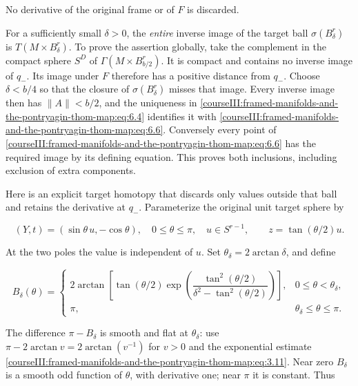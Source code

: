 No derivative of the original frame or of \(F\) is discarded.

For a sufficiently small \(\delta>0\), the \emph{entire} inverse image of the target ball \(\sigma(B_\delta^r)\) is \(T(M\times B_\delta^r)\). To prove the assertion globally, take the complement in the compact sphere \(S^D\) of \(\Gamma(M\times B_{b/2}^r)\). It is compact and contains no inverse image of \(q_-\). Its image under \(F\) therefore has a positive distance from \(q_-\). Choose \(\delta<b/4\) so that the closure of \(\sigma(B_\delta^r)\) misses that image. Every inverse image then has \(\|A\|<b/2\), and the uniqueness in \eqref{courseIII:framed-manifolds-and-the-pontryagin-thom-map:eq:6.4} identifies it with \eqref{courseIII:framed-manifolds-and-the-pontryagin-thom-map:eq:6.6}. Conversely every point of \eqref{courseIII:framed-manifolds-and-the-pontryagin-thom-map:eq:6.6} has the required image by its defining equation. This proves both inclusions, including exclusion of extra components.

Here is an explicit target homotopy that discards only values outside that ball and retains the derivative at \(q_-\). Parameterize the original unit target sphere by

\begin{equation}
(Y,t)=(\sin\theta\,u,-\cos\theta),\quad
       0\leq\theta\leq\pi,\quad u\in S^{r-1},\qquad
 z=\tan(\theta/2)u.
 \label{courseIII:framed-manifolds-and-the-pontryagin-thom-map:eq:6.8}
\end{equation}

At the two poles the value is independent of \(u\). Set \(\theta_\delta=2\arctan\delta\), and define

\begin{equation}
B_\delta(\theta)=
 \begin{cases}
 2\arctan\!\left[
 \tan(\theta/2)
 \exp\!\left(\dfrac{\tan^2(\theta/2)}
                   {\delta^2-\tan^2(\theta/2)}\right)\right],
                                  &0\leq\theta<\theta_\delta,\\
 \pi,                            &\theta_\delta\leq\theta\leq\pi.
 \end{cases}
 \label{courseIII:framed-manifolds-and-the-pontryagin-thom-map:eq:6.9}
\end{equation}

The difference \(\pi-B_\delta\) is smooth and flat at \(\theta_\delta\): use
\(\pi-2\arctan v=2\arctan(v^{-1})\) for \(v>0\) and the exponential estimate \eqref{courseIII:framed-manifolds-and-the-pontryagin-thom-map:eq:3.11}. Near zero \(B_\delta\) is a smooth odd function of \(\theta\), with derivative one; near \(\pi\) it is constant. Thus

